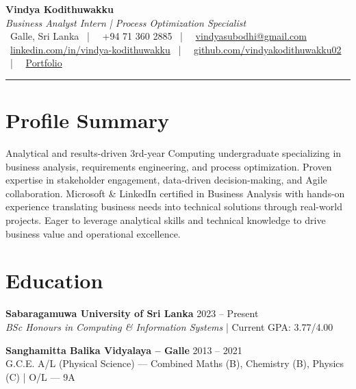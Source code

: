 \documentclass[letterpaper,10pt]{article}
\begin{document}
\begin{center}
{\Huge\color{accentTitle}\textbf{Vindya Kodithuwakku}}\\[3pt]
{\large\textit{Business Analyst Intern | Process Optimization Specialist}}\\[4pt]
\faMapMarker*~Galle, Sri Lanka ~|~
\faPhone~+94 71 360 2885 ~|~
\faEnvelope~\href{mailto:vindyasubodhi@gmail.com}{vindyasubodhi@gmail.com}\\[1pt]
\faLinkedin~\href{https://www.linkedin.com/in/vindya-kodithuwakku-bb6187202}{linkedin.com/in/vindya-kodithuwakku} ~|~
\faGithub~\href{https://github.com/vindyakodithuwakku02}{github.com/vindyakodithuwakku02} ~|~
\faGlobe~\href{https://vindyakodithuwakku.github.io/portfolio}{Portfolio}\\[4pt]
{\color{accentLine}\hrule}
\end{center}

\section{Profile Summary}
\vspace{-1pt}
Analytical and results-driven 3rd-year Computing undergraduate specializing in business analysis, requirements engineering, and process optimization. Proven expertise in stakeholder engagement, data-driven decision-making, and Agile collaboration. Microsoft \& LinkedIn certified in Business Analysis with hands-on experience translating business needs into technical solutions through real-world projects. Eager to leverage analytical skills and technical knowledge to drive business value and operational excellence.

\section{Education}
\vspace{-1pt}

\textbf{Sabaragamuwa University of Sri Lanka} \hfill 2023 – Present\\
\textit{BSc Honours in Computing \& Information Systems} | Current GPA: 3.77/4.00

\vspace{2pt}
\textbf{Sanghamitta Balika Vidyalaya – Galle} \hfill 2013 – 2021\\
G.C.E. A/L (Physical Science) — Combined Maths (B), Chemistry (B), Physics (C) | O/L — 9A
\end{document}
